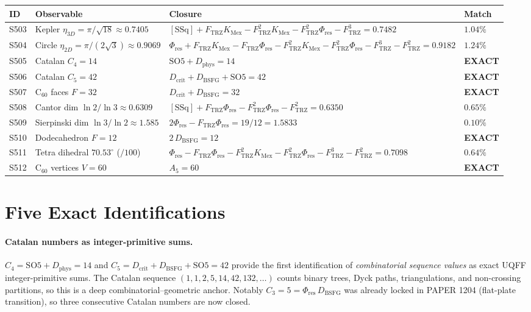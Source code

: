 \documentclass[11pt]{article}
\newcommand{\Ftrz}{F_{\mathrm{TRZ}}}
\newcommand{\Phires}{\Phi_{\mathrm{res}}}
\newcommand{\KMex}{K_{\mathrm{Mex}}}
\newcommand{\Dphys}{D_{\mathrm{phys}}}
\newcommand{\Dbsfg}{D_{\mathrm{BSFG}}}
\newcommand{\Dcrit}{D_{\mathrm{crit}}}
\newcommand{\SOfive}{\mathrm{SO5}}
\newcommand{\Afive}{A_{5}}
\newcommand{\SSq}{[\mathrm{SSq}]}
\begin{document}
\begin{longtable}{@{}llll@{}}
\toprule
ID & Observable & Closure & Match \\
\midrule
\endhead
S503 & Kepler $\eta_{3D}=\pi/\sqrt{18}\approx 0.7405$ & $\SSq+\Ftrz\KMex-\Ftrz^2\KMex-\Ftrz^2\Phires-\Ftrz^3=0.7482$ & $1.04\%$ \\
S504 & Circle $\eta_{2D}=\pi/(2\sqrt{3})\approx 0.9069$ & $\Phires+\Ftrz\KMex-\Ftrz\Phires-\Ftrz^2\KMex-\Ftrz^2\Phires-\Ftrz^3-\Ftrz^2=0.9182$ & $1.24\%$ \\
S505 & Catalan $C_4=14$ & $\SOfive+\Dphys=14$ & \textbf{EXACT} \\
S506 & Catalan $C_5=42$ & $\Dcrit+\Dbsfg+\SOfive=42$ & \textbf{EXACT} \\
S507 & C$_{60}$ faces $F=32$ & $\Dcrit+\Dbsfg=32$ & \textbf{EXACT} \\
S508 & Cantor dim $\ln 2/\ln 3\approx 0.6309$ & $\SSq+\Ftrz\Phires-\Ftrz^2\Phires-\Ftrz^2=0.6350$ & $0.65\%$ \\
S509 & Sierpinski dim $\ln 3/\ln 2\approx 1.585$ & $2\Phires-\Ftrz\Phires=19/12=1.5833$ & $0.10\%$ \\
S510 & Dodecahedron $F=12$ & $2\,\Dbsfg=12$ & \textbf{EXACT} \\
S511 & Tetra dihedral $70.53^\circ$ ($/100$) & $\Phires-\Ftrz\Phires-\Ftrz^2\KMex-\Ftrz^2\Phires-\Ftrz^3-\Ftrz^2=0.7098$ & $0.64\%$ \\
S512 & C$_{60}$ vertices $V=60$ & $\Afive=60$ & \textbf{EXACT} \\
\bottomrule
\end{longtable}

\section{Five Exact Identifications}

\paragraph{Catalan numbers as integer-primitive sums.}
$C_4 = \SOfive + \Dphys = 14$ and $C_5 = \Dcrit + \Dbsfg + \SOfive = 42$
provide the first identification of \emph{combinatorial sequence values} as
exact UQFF integer-primitive sums. The Catalan sequence
$(1,1,2,5,14,42,132,\ldots)$ counts binary trees, Dyck paths, triangulations,
and non-crossing partitions, so this is a deep combinatorial--geometric anchor.
Notably $C_3 = 5 = \Phires\,\Dbsfg$ was already locked in PAPER 1204
(flat-plate transition), so three consecutive Catalan numbers are now closed.
\end{document}
